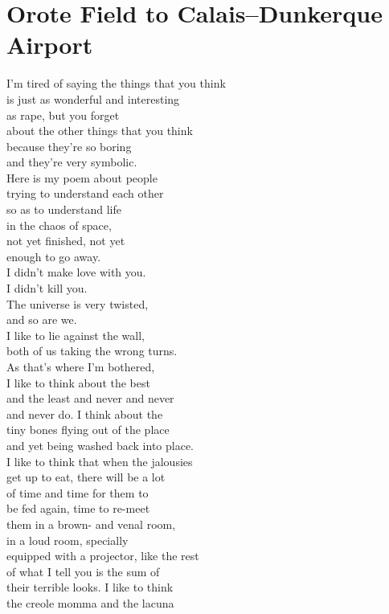 \documentclass[smalldemyvopaper,11pt,twoside,onecolumn,openright,extrafontsizes]{memoir}
\begin{document}
\chapter{Orote Field to Calais–Dunkerque Airport}
I'm tired of saying the things that you think
\\is just as wonderful and interesting
\\as rape, but you forget
\\about the other things that you think
\\because they're so boring
\\and they're very symbolic.
\\Here is my poem about people
\\trying to understand each other
\\so as to understand life
\\in the chaos of space,
\\not yet finished, not yet
\\enough to go away.
\\I didn't make love with you.
\\I didn't kill you.
\\The universe is very twisted,
\\and so are we.
\\I like to lie against the wall,
\\both of us taking the wrong turns.
\\As that's where I'm bothered,
\\I like to think about the best
\\and the least and never and never
\\and never do. I think about the
\\tiny bones flying out of the place
\\and yet being washed back into place.
\\I like to think that when the jalousies
\\get up to eat, there will be a lot
\\of time and time for them to
\\be fed again, time to re-meet
\\them in a brown- and venal room,
\\in a loud room, specially
\\equipped with a projector, like the rest
\\of what I tell you is the sum of
\\their terrible looks. I like to think
\\the creole momma and the lacuna
\end{document}

